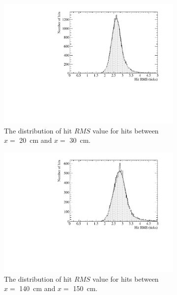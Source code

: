 \begin{figure}
  \centering
  \begin{subfigure}{0.48\textwidth}
    \centering
    \includegraphics[width=\textwidth]{DataCan_0}
    \caption{The distribution of hit $RMS$ value for hits between $x =$ 20~cm and $x =$ 30~cm.}
  \end{subfigure}%
  \hspace{0.03\textwidth}%
  \begin{subfigure}{0.48\textwidth}
    \centering
    \includegraphics[width=\textwidth]{DataCan_1}
    \caption{The distribution of hit $RMS$ value for hits between $x =$ 140~cm and $x =$ 150~cm.}
  \end{subfigure}
  \begin{subfigure}{0.48\textwidth}
    \centering

\end{subfigure}
\end{figure}
